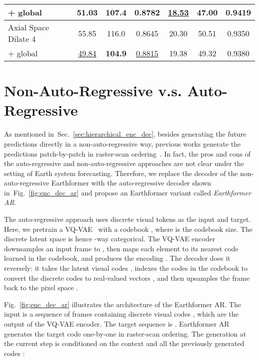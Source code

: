 \documentclass{article}
\newcommand{\bgray}[1]{\colorbox{myGray}{#1}}
\newcommand{\secref}[1]{Sec.~\ref{#1}}
\newcommand{\figref}[1]{Fig.~\ref{#1}}
\begin{document}
\begin{table}[!tb]
\begin{center}
{\begin{tabular}{l|ccc|ccc}
	+ global            & \bgray{51.03}		& \bgray{107.4}		& \bgray{0.8782}	& \bgray{\underline{18.53}}& \bgray{\textbf{47.00}}	& \bgray{\textbf{0.9419}}		\\
	\midrule
	Axial Space Dilate 4& 55.85				& 116.0				& 0.8645			& 20.30				& 50.51				& 0.9350			\\
	+ global            & \bgray{\underline{49.84}}& \bgray{\textbf{104.9}}	& \bgray{\underline{0.8815}}& \bgray{19.38}	& \bgray{49.32}	& \bgray{0.9380}				\\
	\bottomrule[1.5pt]
	\end{tabular}
	}  \end{center}
\end{table}










\clearpage
\section{Non-Auto-Regressive v.s. Auto-Regressive}
\label{sec:nar-vs-ar}
As mentioned in~\secref{sec:hierarchical_enc_dec}, besides generating the future predictions directly in a non-auto-regressive way, previous works generate the predictions patch-by-patch in raster-scan ordering~\cite{weissenborn2019scaling,yan2021videogpt,rakhimov2020latent}. 
In fact, the pros and cons of the auto-regressive and non-auto-regressive approaches are not clear under the setting of Earth system forecasting. 
Therefore, we replace the decoder of the non-auto-regressive Earthformer with the auto-regressive decoder shown in~\figref{fig:enc_dec_ar} and propose an Earthformer variant called \emph{Earthformer AR}.

The auto-regressive approach uses discrete visual tokens as the input and target. Here, we pretrain a VQ-VAE~\cite{van2017neural} with a codebook , where  is the codebook size. The discrete latent space is hence -way categorical. 
The VQ-VAE encoder downsamples an input frame  to , then maps each element to its nearest code  learned in the codebook, and produces the encoding . 
The decoder does it reversely: it takes the latent visual codes , indexes the codes in the codebook to convert the discrete codes to real-valued vectors , and then upsamples the frame back to the pixel space .

\figref{fig:enc_dec_ar} illustrates the architecture of the Earthformer AR.
The input is a sequence of frames containing discrete visual codes , which are the output of the VQ-VAE encoder.
The target sequence is . 
Earthformer AR generates the target code one-by-one in raster-scan ordering. 
The generation at the current step  is conditioned on the context  and all the previously generated codes : 
\end{document}
